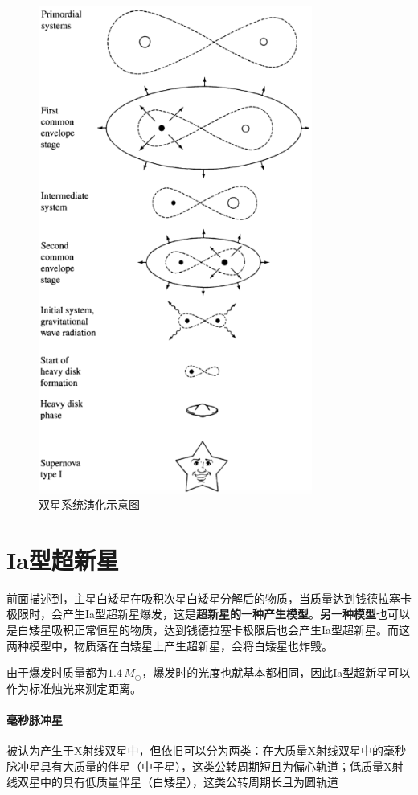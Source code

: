 \documentclass[openany]{ctexbook}
\begin{document}
\begin{figure}[hbt]
  \centering
  \includegraphics[width=9cm]{chapters/18/evolution}
  \caption{双星系统演化示意图}
  \label{fig:binaryevolution}
\end{figure}

\section{Ia型超新星}
前面描述到，主星白矮星在吸积次星白矮星分解后的物质，当质量达到钱德拉塞卡极限时，会产生Ia型超新星爆发，这是\textbf{超新星的一种产生模型}。\textbf{另一种模型}也可以是白矮星吸积正常恒星的物质，达到钱德拉塞卡极限后也会产生Ia型超新星。而这两种模型中，物质落在白矮星上产生超新星，会将白矮星也炸毁。

由于爆发时质量都为$1.4\,M_\odot$，爆发时的光度也就基本都相同，因此Ia型超新星可以作为标准烛光来测定距离。

\paragraph{毫秒脉冲星}
被认为产生于X射线双星中，但依旧可以分为两类：在大质量X射线双星中的毫秒脉冲星具有大质量的伴星（中子星），这类公转周期短且为偏心轨道；低质量X射线双星中的具有低质量伴星（白矮星），这类公转周期长且为圆轨道
\end{document}
